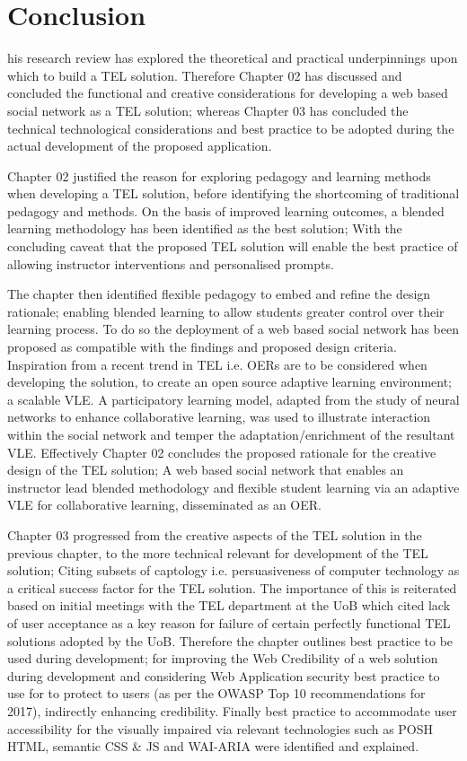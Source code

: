 %
%
\let\textcircled=\pgftextcircled
\chapter{Conclusion}
\label{chap:Conclusion}


his research review has explored the theoretical and practical underpinnings upon which to build a TEL solution. Therefore Chapter 02 has discussed and concluded the functional and creative considerations for developing a web based social network as a TEL solution; whereas Chapter 03 has concluded the technical technological considerations and best practice to be adopted during the actual development of the proposed application.

Chapter 02 justified the reason for exploring pedagogy and learning methods when developing a TEL solution, before identifying the shortcoming of  traditional pedagogy and methods. On the basis of improved learning outcomes, a blended learning methodology has been identified as the best solution; With the concluding caveat that the proposed TEL solution will enable the best practice of allowing instructor interventions and personalised prompts.

The chapter then identified flexible pedagogy to embed and refine the design rationale; enabling blended learning to allow students greater control over their learning process. To do so the deployment of a web based social network has been proposed as compatible with the findings and proposed design criteria. Inspiration from a recent trend in TEL i.e. OERs are to be considered when developing the solution, to create an open source adaptive learning environment; a scalable VLE. A participatory learning model, adapted from the study of neural networks to enhance collaborative learning, was used to illustrate interaction within the social network and temper the adaptation/enrichment of the resultant VLE. Effectively Chapter 02 concludes the proposed rationale for the creative design of the TEL solution; A web based social network that enables an instructor lead blended methodology and flexible student learning via an adaptive VLE for collaborative learning, disseminated as an OER.

Chapter 03 progressed from the creative aspects of the TEL solution in the previous chapter, to the more technical relevant for development of the TEL solution; Citing subsets of captology i.e. persuasiveness of computer technology as a critical success factor for the TEL solution. The importance of this is reiterated based on initial meetings with the TEL department at the UoB which cited lack of user acceptance as a key reason for failure of certain perfectly functional TEL solutions adopted by the UoB. Therefore the chapter outlines best practice to be used during development; for improving the Web Credibility of a web solution during development and considering Web Application security best practice to use for to protect to users (as per the OWASP Top 10 recommendations for 2017), indirectly enhancing credibility. Finally best practice to accommodate user accessibility for the visually impaired via relevant technologies such as POSH HTML, semantic CSS \& JS and WAI-ARIA were identified and explained.

